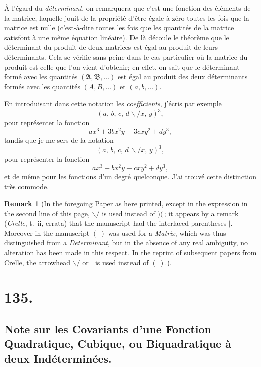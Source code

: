 \documentclass[11pt,a4paper]{book}
\newtheorem*{remark}{Remark}
\begin{document}
\medskip

\`A l'\'egard du \textit{d\'eterminant}, on remarquera que c'est une
fonction des \'el\'ements de la matrice, laquelle jouit de la propri\'et\'e
d'\^etre \'egale \`a z\'ero toutes les fois que la matrice est nulle (c'est-\`a-dire
toutes les fois que les quantit\'es de la matrice satisfont \`a une m\^eme
\'equation lin\'eaire). De l\`a d\'ecoule le th\'eor\`eme que le d\'eterminant
du produit de deux matrices est \'egal au produit de leurs d\'eterminants.
Cela se v\'erifie sans peine dans le cas particulier o\`u la matrice du
produit est celle que l'on vient d'obtenir; en effet, on sait que le
d\'eterminant form\'e avec les quantit\'es $(\mathfrak{A},\mathfrak{B},\ldots)$
est \'egal au produit des deux d\'eterminants form\'es avec les quantit\'es
$(A, B,\ldots)$ et $(a, b,\ldots)$.

\medskip

En introduisant dans cette notation les \textit{coefficients}, j'\'ecris
par exemple
\[
(a,\, b,\, c,\, d\!\!\backslash\!\!\!/ x,\, y)^3,
\]
pour repr\'esenter la fonction
\[
ax^3 + 3bx^2y + 3cxy^2 + dy^3,
\]
tandis que je me sers de la notation
\[
(a,\, b,\, c,\, d\,\backslash\!\!\!/ x,\, y)^3,
\]
pour repr\'esenter la fonction
\[
ax^3 + bx^2y + cxy^2 + dy^3,
\]
et de m\^eme pour les fonctions d'un degr\'e quelconque. J'ai trouv\'e cette
distinction tr\`es commode.

\begin{remark}
[In the foregoing Paper as here printed, except in the expression in the
second line of this page, $\backslash\!\!\!/$ is used instead of $)(\,$;
it appears by a remark (\textit{Crelle}, t.~ii, errata) that the
manuscript had the interlaced parentheses $\mid$. Moreover in the
manuscript $(\;)$ was used for a \textit{Matrix}, which was thus
distinguished from a \textit{Determinant}, but in the absence of any real
ambiguity, no alteration has been made in this respect. In the reprint of
subsequent papers from Crelle, the arrowhead $\backslash\!\!\!/$ or
$\mid$ is used instead of $(\;)$.]
\end{remark}

\newpage
\section*{135.}
\subsection*{Note sur les Covariants d'une Fonction Quadratique, Cubique, ou Biquadratique \`a deux Ind\'etermin\'ees.}
\end{document}
